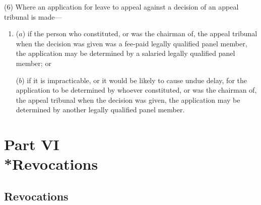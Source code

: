 \documentclass[12pt,a4paper]{article}
\begin{document}

(6) Where an application for leave to appeal against a decision of an appeal tribunal is made—
\begin{enumerate}\item[]
($a$) if the person who constituted, or was the chairman of, the appeal tribunal when the decision was given was a fee-paid legally qualified panel member, the application may be determined by a salaried legally qualified panel member; or

($b$) if it is impracticable, or it would be likely to cause undue delay, for the application to be determined by whoever constituted, or was the chairman of, the appeal tribunal when the decision was given, the application may be determined by another legally qualified panel member.
\end{enumerate}


\section[Part VI --- Revocations]{Part VI\\*Revocations}

\subsection[59. Revocations]{Revocations}
\end{document}
